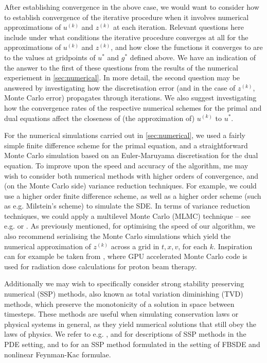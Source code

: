 After establishing convergence in the above case, we would want to consider how to establish convergence of the iterative procedure when it involves numerical approximations of $u^{(k)}$ and $z^{(k)}$ at each iteration. Relevant questions here include under what conditions the iterative procedure converges at all for the approximations of $u^{(k)}$ and $z^{(k)}$, and how close the functions it converges to are to the values at gridpoints of $u^{*}$ and $g^{*}$ defined above. We have an indication of the answer to the first of these questions from the results of the numerical experiement in \autoref{sec:numerical}. In more detail, the second question may be answered by investigating how the discretisation error (and in the case of $z^{(k)}$, Monte Carlo error) propagates through iterations. We also suggest investigating how the convergence rates of the respective numerical schemes for the primal and dual equations affect the closeness of (the approximation of) $u^{(k)}$ to $u^{*}$.

For the numerical simulations carried out in \autoref{sec:numerical}, we used a fairly simple finite difference scheme for the primal equation, and a straightforward Monte Carlo simulation based on an Euler-Maruyama discretisation for the dual equation. To improve upon the speed and accuracy of the algorithm, me may wish to consider both numerical methods with higher orders of convergence, and (on the Monte Carlo side) variance reduction techniques. For example, we could use a higher order finite difference scheme, as well as a higher order scheme (such as e.g. Milstein's scheme) to simulate the SDE. In terms of variance reduction techniques, we could apply a multilevel Monte Carlo (MLMC) technique -- see e.g. \cite{giles2008multilevel} or \cite{gobet2016monte}. As previously mentioned, for optimising the speed of our algorithm, we also recommend serialising the Monte Carlo simulations which yield the numerical approximation of $z^{(k)}$ across a grid in $t,x,v$, for each $k$. Inspiration can for example be taken from \cite{jia2012gpu}, where GPU accelerated Monte Carlo code is used for radiation dose calculations for proton beam therapy.

Additionally we may wish to specifically consider strong stability preserving numerical (SSP) methods, also known as total variation diminishing (TVD) methods, which preserve the monotonicity of a solution in space between timesteps. These methods are useful when simulating conservation laws or physical systems in general, as they yield numerical solutions that still obey the laws of physics. We refer to e.g. \cite{gottlieb2001strong}, \cite{gottlieb2005high} and \cite{harten1983upstream} for descriptions of SSP methods in the PDE setting, and to \cite{fang2023strong} for an SSP method formulated in the setting of FBSDE and nonlinear Feynman-Kac formulae. 

